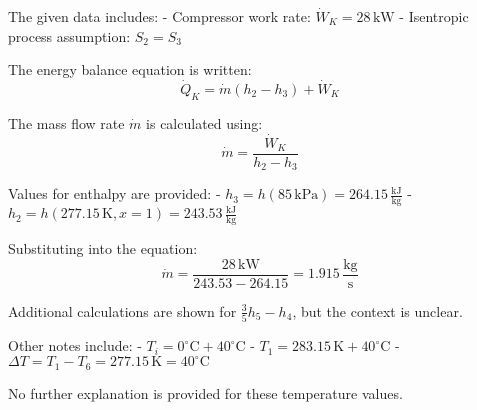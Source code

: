 The given data includes:  
- Compressor work rate: \( \dot{W}_K = 28 \, \text{kW} \)  
- Isentropic process assumption: \( S_2 = S_3 \)  

The energy balance equation is written:  
\[
\dot{Q}_K = \dot{m} (h_2 - h_3) + \dot{W}_K
\]  

The mass flow rate \( \dot{m} \) is calculated using:  
\[
\dot{m} = \frac{\dot{W}_K}{h_2 - h_3}
\]  

Values for enthalpy are provided:  
- \( h_3 = h(85 \, \text{kPa}) = 264.15 \, \frac{\text{kJ}}{\text{kg}} \)  
- \( h_2 = h(277.15 \, \text{K}, x=1) = 243.53 \, \frac{\text{kJ}}{\text{kg}} \)  

Substituting into the equation:  
\[
\dot{m} = \frac{28 \, \text{kW}}{243.53 - 264.15} = 1.915 \, \frac{\text{kg}}{\text{s}}
\]  

Additional calculations are shown for \( \frac{3}{5} h_5 - h_4 \), but the context is unclear.  

Other notes include:  
- \( T_i = 0^\circ \text{C} + 40^\circ \text{C} \)  
- \( T_1 = 283.15 \, \text{K} + 40^\circ \text{C} \)  
- \( \Delta T = T_1 - T_6 = 277.15 \, \text{K} = 40^\circ \text{C} \)  

No further explanation is provided for these temperature values.